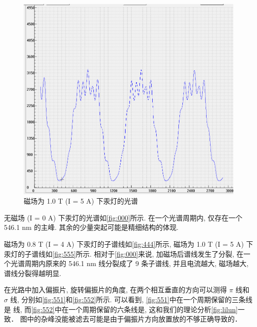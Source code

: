 \documentclass[font=default]{mpltx}
\begin{document}
\begin{figure}[htbp]
  \centering
  \includegraphics[width=0.85\linewidth]{fig/2.png}
  \caption{磁场为 1.0 T (I = 5 A) 下汞灯的光谱}
  \label{fig:555}
\end{figure}

  无磁场 (I = 0 A) 下汞灯的光谱如\autoref{fig:000}所示. 在一个光谱周期内, 仅存在一个 546.1 nm 的主峰. 其余的少量突起可能是精细结构的体现.
  \par
  磁场为 0.8 T (I = 4 A) 下汞灯的子谱线如\autoref{fig:444}所示, 磁场为 1.0 T (I = 5 A) 下汞灯的子谱线如\autoref{fig:555}所示. 
  相对于\autoref{fig:000}来说, 加磁场后谱线发生了分裂, 在一个光谱周期内原来的 546.1 nm 线分裂成了 9 条子谱线, 
  并且电流越大, 磁场越大, 谱线分裂得越明显. 

  在光路中加入偏振片, 旋转偏振片的角度, 在两个相互垂直的方向可以测得 $\pi$ 线和 $\sigma$ 线, 分别如\autoref{fig:551}和\autoref{fig:552}所示.
  可以看到, \autoref{fig:551}中在一个周期保留的三条线是 \pi 线, 
  而\autoref{fig:552}中在一个周期保留的六条线是, 这和我们的理论分析\autoref{fig:lilun}一致．
  图中的杂峰没能被滤去可能是由于偏振片方向放置放的不够正确导致的．
\end{document}
